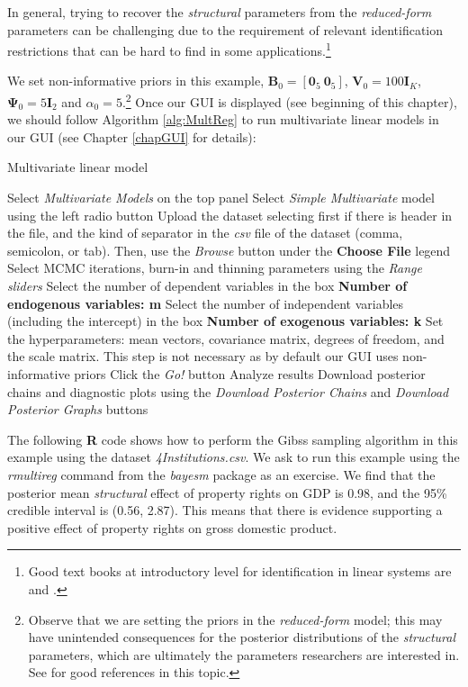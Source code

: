 In general, trying to recover the \textit{structural} parameters from the \textit{reduced-form} parameters can be challenging due to the requirement of relevant identification restrictions that can be hard to find in some applications.\footnote{Good text books at introductory level for identification in linear systems are \cite[Chap. ~19]{gujarati2009basic} and \cite[Chap. ~16]{wooldridge2016introductory}.}

We set non-informative priors in this example, $\bm{B}_0=\left[\bm{0}_5 \ \bm{0}_5\right]$, $\bm{V}_0=100\bm{I}_K$, $\bm{\Psi}_0=5\bm{I}_2$ and $\alpha_0=5$.\footnote{Observe that we are setting the priors in the \textit{reduced-form} model; this may have unintended consequences for the posterior distributions of the \textit{structural} parameters, which are ultimately the parameters researchers are interested in. See \cite[p.~302]{koop2003bayesian} for good references in this topic.} Once our GUI is displayed (see beginning of this chapter), we should follow Algorithm \ref{alg:MultReg} to run multivariate linear models in our GUI (see Chapter \ref{chapGUI} for details):
\begin{algorithm}[h!]
	\caption{Multivariate linear model}\label{alg:MultReg}
	\begin{algorithmic}[1]  		 			
		\State Select \textit{Multivariate Models} on the top panel
		\State Select \textit{Simple Multivariate} model using the left radio button
		\State Upload the dataset selecting first if there is header in the file, and the kind of separator in the \textit{csv} file of the dataset (comma, semicolon, or tab). Then, use the \textit{Browse} button under the \textbf{Choose File} legend
		\State Select MCMC iterations, burn-in and thinning parameters using the \textit{Range sliders}
		\State Select the number of dependent variables in the box \textbf{Number of endogenous variables: m}
		\State Select the number of independent variables (including the intercept) in the box \textbf{Number of exogenous variables: k}
		\State Set the hyperparameters: mean vectors, covariance matrix, degrees of freedom, and the scale matrix. This step is not necessary as by default our GUI uses non-informative priors
		\State Click the \textit{Go!} button
		\State Analyze results
		\State Download posterior chains and diagnostic plots using the \textit{Download Posterior Chains} and \textit{Download Posterior Graphs} buttons
	\end{algorithmic} 
\end{algorithm}

The following \textbf{R} code shows how to perform the Gibss sampling algorithm in this example using the dataset \textit{4Institutions.csv}. We ask to run this example using the \textit{rmultireg} command from the \textit{bayesm} package as an exercise. We find that the posterior mean \textit{structural} effect of property rights on GDP is 0.98, and the 95\% credible interval is (0.56, 2.87). This means that there is evidence supporting a positive effect of property rights on gross domestic product. 

